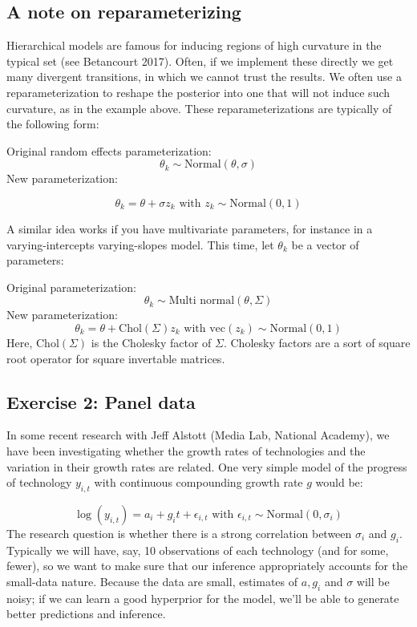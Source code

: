 \documentclass[]{book}
\begin{document}
\subsection{A note on
reparameterizing}\label{a-note-on-reparameterizing}

Hierarchical models are famous for inducing regions of high curvature in
the typical set (see Betancourt 2017). Often, if we implement these
directly we get many divergent transitions, in which we cannot trust the
results. We often use a reparameterization to reshape the posterior into
one that will not induce such curvature, as in the example above. These
reparameterizations are typically of the following form:

Original random effects parameterization: \[
\theta_{k} \sim \mbox{Normal}(\theta, \sigma)
\] New parameterization:

\[
\theta_{k} = \theta + \sigma z_{k} \mbox{  with } z_{k} \sim \mbox{Normal}(0, 1)
\]

A similar idea works if you have multivariate parameters, for instance
in a varying-intercepts varying-slopes model. This time, let
\(\theta_{k}\) be a vector of parameters:

Original parameterization: \[
\theta_{k} \sim \mbox{Multi normal}(\theta, \Sigma)
\] New parameterization: \[
\theta_{k} = \theta + \mbox{Chol}(\Sigma) z_{k} \mbox{  with } \mbox{vec}(z_{k}) \sim \mbox{Normal}(0, 1)
\] Here, \(\mbox{Chol}(\Sigma)\) is the Cholesky factor of \(\Sigma\).
Cholesky factors are a sort of square root operator for square
invertable matrices.

\subsection{Exercise 2: Panel data}\label{exercise-2-panel-data}

In some recent research with Jeff Alstott (Media Lab, National Academy),
we have been investigating whether the growth rates of technologies and
the variation in their growth rates are related. One very simple model
of the progress of technology \(y_{i,t}\) with continuous compounding
growth rate \(g\) would be:

\[
\log(y_{i, t}) = a_{i} + g_{i}t + \epsilon_{i,t} \mbox{ with } \epsilon_{i,t} \sim \mbox{Normal}(0, \sigma_{i})
\] The research question is whether there is a strong correlation
between \(\sigma_{i}\) and \(g_{i}\). Typically we will have, say, 10
observations of each technology (and for some, fewer), so we want to
make sure that our inference appropriately accounts for the small-data
nature. Because the data are small, estimates of \(a, g_{i}\) and
\(\sigma\) will be noisy; if we can learn a good hyperprior for the
model, we'll be able to generate better predictions and inference.
\end{document}
